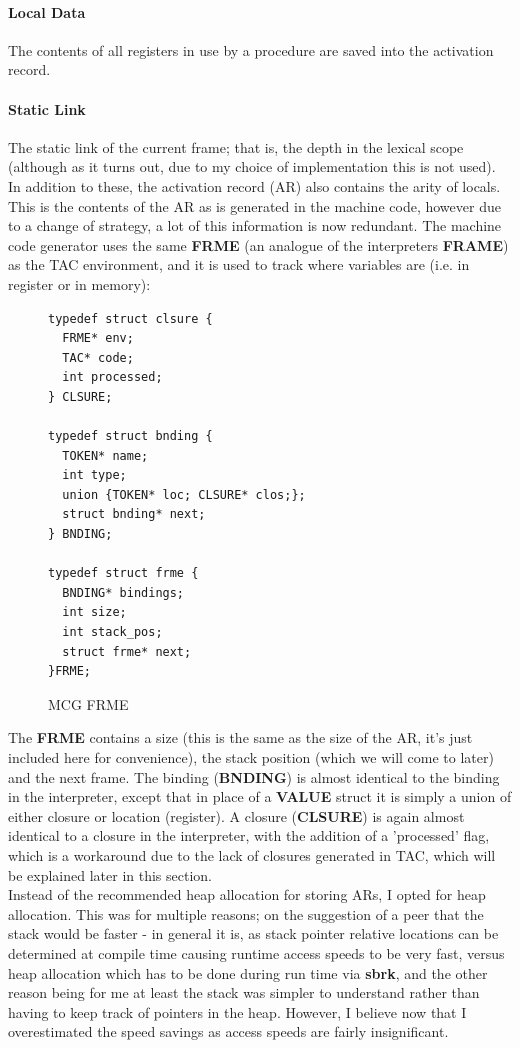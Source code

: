 \documentclass[12pt]{article}
\begin{document}
\paragraph{Local Data} The contents of all registers in use by a procedure are saved into the activation record. 
\paragraph{Static Link} The static link of the current frame; that is, the depth in the lexical scope (although as it turns out, due to my choice of implementation this is not used).
In addition to these, the activation record (AR) also contains the arity of locals. \\\newline
This is the contents of the AR as is generated in the machine code, however due to a change of strategy, a lot of this information is now redundant. 
The machine code generator uses the same \textbf{FRME} (an analogue of the interpreters \textbf{FRAME}) as the TAC environment, and it is used to track where variables are (i.e. in register or in memory):
\begin{figure}[H]
  \begin{verbatim}
typedef struct clsure {
  FRME* env;
  TAC* code;
  int processed;
} CLSURE;

typedef struct bnding {
  TOKEN* name;
  int type;
  union {TOKEN* loc; CLSURE* clos;};
  struct bnding* next;
} BNDING;

typedef struct frme {
  BNDING* bindings;
  int size;
  int stack_pos;
  struct frme* next;
}FRME;
  \end{verbatim}
  \caption{MCG FRME}
  \label{frme}
\end{figure} 
The \textbf{FRME} contains a size (this is the same as the size of the AR, it's just included here for convenience), the stack position (which we will come to later) and the next frame. The binding (\textbf{BNDING}) is almost identical to the binding in the interpreter, except that in place of a \textbf{VALUE} struct it is simply a union of either closure or location (register).
A closure (\textbf{CLSURE}) is again almost identical to a closure in the interpreter, with the addition of a 'processed' flag, which is a workaround due to the lack of closures generated in TAC, which will be explained later in this section. 
\\\newline Instead of the recommended heap allocation for storing ARs, I opted for heap allocation. This was for multiple reasons; on the suggestion of a peer that the stack would be faster - in general it is, as stack pointer relative locations can be determined at compile time causing runtime access speeds to be very fast, versus heap allocation which has to be done during run time via \textbf{sbrk}, and the other reason being for me at least the stack was simpler to understand rather than having to keep track of pointers in the heap. However, I believe now that I overestimated the speed savings as access speeds are fairly insignificant.
\end{document}
